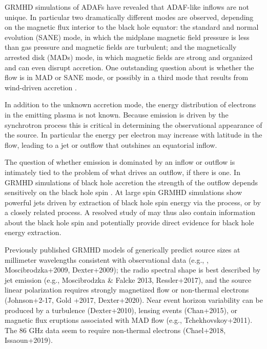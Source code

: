 GRMHD simulations of ADAFs have revealed that ADAF-like inflows are not unique. In particular two dramatically different modes are observed, depending on the magnetic flux interior to the black hole equator: the standard and normal evolution (SANE) mode, in which the midplane magnetic field pressure is less than gas pressure and magnetic fields are turbulent; and the magnetically arrested disk (MADs) mode, in which magnetic fields are strong and organized and can even disrupt accretion.  One outstanding question about \sgra is whether the flow is in MAD or SANE mode, or possibly in a third mode that results from wind-driven accretion \citep{2020ApJ...896L...6R}.

In addition to the unknown accretion mode, the energy distribution of electrons in the emitting plasma is not known.  Because emission is driven by the synchrotron process this is critical in determining the observational appearance of the source.  In particular the energy per electron may increase with latitude in the flow, leading to a jet or outflow that outshines an equatorial inflow.  

The question of whether emission is dominated by an inflow or outflow is intimately tied to the problem of what drives an outflow, if there is one.  In GRMHD simulations of black hole accretion the strength of the outflow depends sensitively on the black hole spin \citep[e.g.]{M87PaperV}.  At large spin GRMHD simulations show powerful jets driven by extraction of black hole spin energy via the \cite{1977MNRAS.179..433B} process, or by a closely related process.  A resolved study of \sgra may thus also contain information about the black hole spin and potentially provide direct evidence for black hole energy extraction.   


Previously published GRMHD models of \sgra generically predict source sizes at millimeter wavelengths consistent with observational data (e.g., \citealt{2008Natur.455...78D}, Moscibrodzka+2009, Dexter+2009);
the radio spectral shape is best described by jet emission (e.g., Moscibrodzka \& Falcke 2013, Ressler+2017), and the source linear polarization requires strongly magnetized flow or non-thermal electrons (Johnson+2-17, Gold +2017, Dexter+2020). Near event horizon variability can be produced by a turbulence (Dexter+2010), lensing events (Chan+2015), or magnetic flux eruptions associated with MAD flow (e.g., Tchekhovskoy+2011). The 86 GHz data seem to require non-thermal electrons (Chael+2018, Issaoun+2019). 

